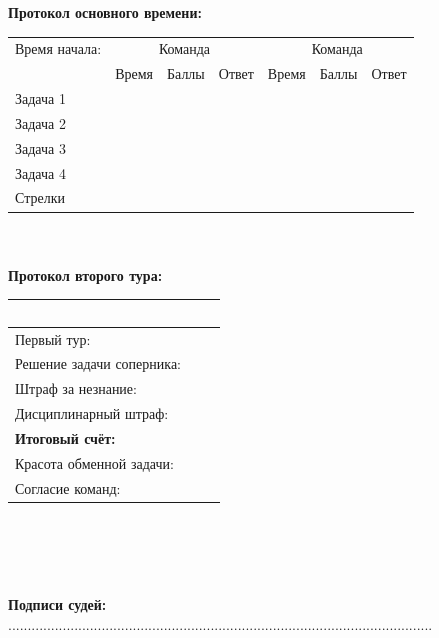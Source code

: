 \documentclass[12pt]{article}
\begin{document}
\begin{center}{\bf Протокол основного времени: } \\ 
\begin{tabular}{|p{3.3cm}|p{1.5cm}|p{2cm}|p{1.5cm}|p{1.5cm}|p{2cm}|p{1.5cm}|}
\hline Время начала: & \multicolumn{3}{c|}{Команда } & \multicolumn{3}{c|}{Команда  }\\\cline{2-7} {} & Время & Баллы  & Ответ & Время & Баллы  & Ответ \\\hline \hline \center Задача 1 &{}&{}&{}&{}&{}&{}\\[20mm]\hline \hline \center Задача 2 &{}&{}&{}&{}&{}&{}\\[20mm]\hline \hline \center Задача 3 &{}&{}&{}&{}&{}&{}\\[20mm]\hline \hline \center Задача 4 &{}&{}&{}&{}&{}&{}\\[20mm]\hline \hline \center Стрелки &{}&{}&{}&{}&{}&{}\\[20mm]\hline
\end{tabular}
$ $\\
$ $\\
{\bf Протокол второго тура: } \\ 
\begin{tabular}{ | p{7cm} | p{1cm} | p{1cm} |}
\hline
$ $ & \centering  & $\;$ \\ \hline\raggedleft Первый тур: & & \\ \hline\raggedleft Решение задачи соперника: & & \\ \hline\raggedleft Штраф за незнание: & & \\ \hline\raggedleft Дисциплинарный штраф: & & \\ \hline\raggedleft \bf Итоговый счёт: & & \\ \hline \hline\raggedleft Красота обменной задачи: & & \\ \hline\raggedleft Согласие команд: & & \\ \hline\end{tabular}\end{center}
$ $\\
$ $\\
$ $\\
$ $\\
{\bf Подписи судей: }.............................................................................................................
\end{document}
